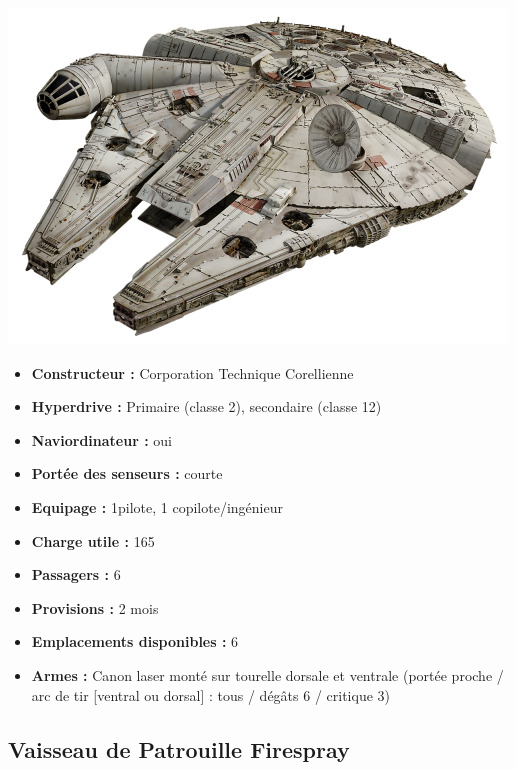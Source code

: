 \documentclass[twoside]{article}
\begin{document}
\noindent\begin{minipage}{0.3\textwidth}
	\includegraphics[width=1\linewidth]{../_img/species/yt}
\end{minipage}%
\hfill%
\begin{minipage}{0.7\textwidth}\raggedleft
	\begin{itemize}
		\item \textbf{Constructeur :} Corporation Technique Corellienne
		\item \textbf{Hyperdrive :} Primaire (classe 2), secondaire (classe 12)
		\item \textbf{Naviordinateur :} oui
		\item \textbf{Portée des senseurs :} courte
		\item \textbf{Equipage :} 1pilote, 1 copilote/ingénieur
		\item \textbf{Charge utile :} 165
		\item \textbf{Passagers :} 6
		\item \textbf{Provisions :} 2 mois
		\item \textbf{Emplacements disponibles :} 6
		\item \textbf{Armes :} Canon laser monté sur tourelle dorsale et ventrale (portée proche / arc de tir [ventral ou dorsal] : tous / dégâts 6 / critique 3)
	\end{itemize}
\end{minipage}

\subsection*{Vaisseau de Patrouille Firespray}
\end{document}

